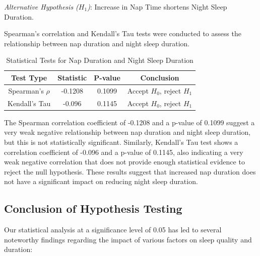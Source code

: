 \documentclass[conference]{IEEEtran}
\begin{document}
\textit{Alternative Hypothesis (\(H_1\))}: Increase in Nap Time shortens Night Sleep Duration.

Spearman's correlation and Kendall’s Tau tests were conducted to assess the relationship between nap duration and night sleep duration.

\begin{table}[ht]
    \centering
    \caption{Statistical Tests for Nap Duration and Night Sleep Duration}
    \label{tab:hypothesis5}
    \begin{tabular}{|c|c|c|c|}
        \hline
        \textbf{Test Type}  & \textbf{Statistic} & \textbf{P-value} & \textbf{Conclusion}            \\
        \hline
        Spearman's \(\rho\) & -0.1208            & 0.1099           & Accept \(H_0\), reject \(H_1\) \\
        \hline
        Kendall’s Tau       & -0.096             & 0.1145           & Accept \(H_0\), reject \(H_1\) \\
        \hline
    \end{tabular}
\end{table}

The Spearman correlation coefficient of -0.1208 and a p-value of 0.1099 suggest a very weak negative relationship between nap duration and night sleep duration, but this is not statistically significant. Similarly, Kendall's Tau test shows a correlation coefficient of -0.096 and a p-value of 0.1145, also indicating a very weak negative correlation that does not provide enough statistical evidence to reject the null hypothesis. These results suggest that increased nap duration does not have a significant impact on reducing night sleep duration.

\subsection*{Conclusion of Hypothesis Testing}
Our statistical analysis at a significance level of 0.05 has led to several noteworthy findings regarding the impact of various factors on sleep quality and duration:
\end{document}
